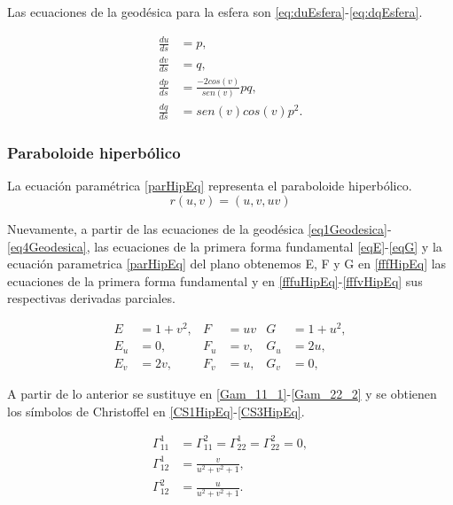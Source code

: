 \documentclass{endm}
\begin{document}
Las ecuaciones de la geod\'esica para la esfera son \ref{eq:duEsfera}-\ref{eq:dqEsfera}.

{\small
\begin{align}
\frac{du}{ds}&=p,\label{eq:duEsfera} \\
\frac{dv}{ds}&=q,\label{eq:dvEsfera}     \\
\frac{dp}{ds}&=\frac{-2cos(v)}{sen(v)} pq, \label{eq:dpEsfera}\\ 
\frac{dq}{ds}&= sen(v)cos(v) p^2. \label{eq:dqEsfera}
\end{align}
}

\subsubsection{Paraboloide hiperb\'olico}

La ecuaci\'on param\'etrica \ref{parHipEq} representa el paraboloide hiperb\'olico.
{\small
\begin{equation} \label{parHipEq}
r(u,v) = (u,v,uv)
\end{equation}
}

Nuevamente, a partir de las ecuaciones de la geod\'esica \ref{eq1Geodesica}-\ref{eq4Geodesica}, las ecuaciones de la primera forma fundamental \ref{eqE}-\ref{eqG} y la ecuaci\'on parametrica \ref{parHipEq} del plano obtenemos E, F y G en \ref{fffHipEq} las ecuaciones de la primera forma fundamental y en \ref{fffuHipEq}-\ref{fffvHipEq} sus respectivas derivadas parciales.

{\small
\begin{align}
E&=1+v^2,   & F &=uv    & G&=1+u^2, \label{fffHipEq} \\
E_u&=0,     & F_u&=v,   & G_u&=2u, \label{fffuHipEq}\\
E_v&=2v,    & F_v&=u,   & G_v&=0, \label{fffvHipEq}
\end{align}
}

A partir de lo anterior se sustituye en \ref{Gam_11_1}-\ref{Gam_22_2} y se obtienen los s\'imbolos de Christoffel en \ref{CS1HipEq}-\ref{CS3HipEq}.

{\small
\begin{align}
\Gamma_{11}^1&=\Gamma_{11}^2=\Gamma_{22}^1=\Gamma_{22}^2=0, \label{CS1HipEq} \\
\Gamma_{12}^1&=\frac{v}{u^2+v^2+1},  \label{CS2HipEq}   \\
\Gamma_{12}^2&=\frac{u}{u^2+v^2+1}.  \label{CS3HipEq}
\end{align}
}
\end{document}
